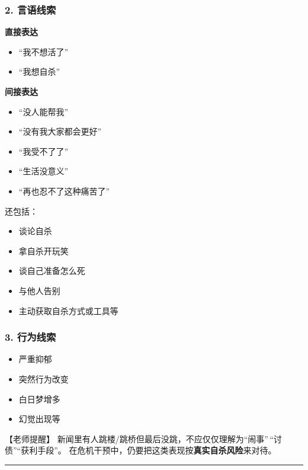 \documentclass[
  chinese,
  9pt,
  a4paper,
]{ctexart}
\providecommand{\tightlist}{%
  \setlength{\itemsep}{0pt}\setlength{\parskip}{0pt}}
\begin{document}
\subsubsection{2. 言语线索}\label{ux8a00ux8bedux7ebfux7d22}

\textbf{直接表达}

\begin{itemize}
\tightlist
\item
  ``我不想活了''
\item
  ``我想自杀''
\end{itemize}

\textbf{间接表达}

\begin{itemize}
\tightlist
\item
  ``没人能帮我''
\item
  ``没有我大家都会更好''
\item
  ``我受不了了''
\item
  ``生活没意义''
\item
  ``再也忍不了这种痛苦了''
\end{itemize}

还包括：

\begin{itemize}
\tightlist
\item
  谈论自杀
\item
  拿自杀开玩笑
\item
  谈自己准备怎么死
\item
  与他人告别
\item
  主动获取自杀方式或工具等
\end{itemize}

\subsubsection{3. 行为线索}\label{ux884cux4e3aux7ebfux7d22}

\begin{itemize}
\tightlist
\item
  严重抑郁
\item
  突然行为改变
\item
  白日梦增多
\item
  幻觉出现等
\end{itemize}

【老师提醒】
新闻里有人跳楼/跳桥但最后没跳，不应仅仅理解为``闹事''\,``讨债''``获利手段''。
在危机干预中，仍要把这类表现按\textbf{真实自杀风险}来对待。

\begin{center}\rule{0.5\linewidth}{0.5pt}\end{center}
\end{document}
